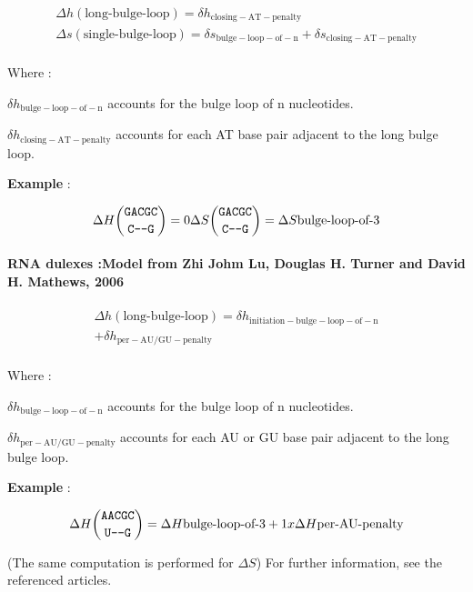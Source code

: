 \documentclass{article}
\begin{document}
\begin{multline*}
\Delta h {(\mbox{long-bulge-loop})} =
\delta{}h_\mathrm{closing-AT-penalty}\\
\Delta s {(\mbox{single-bulge-loop})} =
\delta{}s_\mathrm{bulge-loop-of-n} +
\delta{}s_\mathrm{closing-AT-penalty}\\
\end{multline*}


Where :

$\delta{}h_\mathrm{bulge-loop-of-n}$ accounts for the bulge loop of n nucleotides.

$\delta{}h_\mathrm{closing-AT-penalty}$ accounts for each AT base pair adjacent
to the long bulge loop.

\textbf{Example} :

\begin{multline*}
\Delta H {\mbox{\texttt{GACGC}} \choose \mbox{\texttt{C---G}}} =
0
\Delta S {\mbox{\texttt{GACGC}} \choose \mbox{\texttt{C---G}}} =
\Delta S {\mbox{bulge-loop-of-3}} \\
\end{multline*}

\paragraph{RNA dulexes :\textbf{Model from Zhi Johm Lu, Douglas H. Turner and David H. Mathews, 2006}} 

\begin{multline*}
\Delta h {(\mbox{long-bulge-loop})} =
\delta{}h_\mathrm{initiation-bulge-loop-of-n} \\ +
\delta{}h_\mathrm{per-AU/GU-penalty}\\
\end{multline*}


Where :

$\delta{}h_\mathrm{bulge-loop-of-n}$ accounts for the bulge loop of n nucleotides.

$\delta{}h_\mathrm{per-AU/GU-penalty}$ accounts for each AU or GU base pair adjacent
to the long bulge loop.


\textbf{Example} :

\begin{multline*}
\Delta H {\mbox{\texttt{AACGC}} \choose \mbox{\texttt{U---G}}} =
\Delta H {\mbox{bulge-loop-of-3}} +
1 x \Delta H {\mbox{per-AU-penalty}} \\
\end{multline*}

       (The same computation is performed for $\Delta S$) 
For further information, see the referenced articles.
\end{document}
